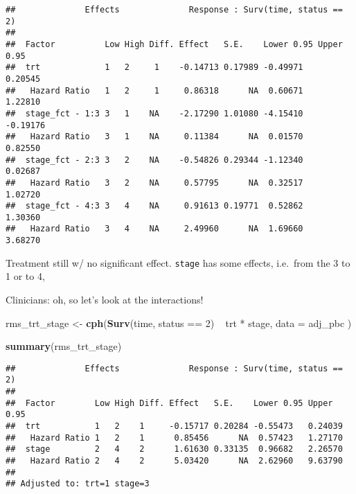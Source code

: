 \documentclass[]{book}
\newenvironment{Shaded}{\begin{snugshade}}{\end{snugshade}}
\newcommand{\KeywordTok}[1]{\textcolor[rgb]{0.13,0.29,0.53}{\textbf{{#1}}}}
\newcommand{\DataTypeTok}[1]{\textcolor[rgb]{0.13,0.29,0.53}{{#1}}}
\newcommand{\DecValTok}[1]{\textcolor[rgb]{0.00,0.00,0.81}{{#1}}}
\newcommand{\StringTok}[1]{\textcolor[rgb]{0.31,0.60,0.02}{{#1}}}
\newcommand{\OtherTok}[1]{\textcolor[rgb]{0.56,0.35,0.01}{{#1}}}
\newcommand{\NormalTok}[1]{{#1}}
\theoremstyle{definition}
\theoremstyle{definition}
\theoremstyle{definition}
\theoremstyle{remark}
\begin{document}
\begin{verbatim}
##              Effects              Response : Surv(time, status == 2) 
## 
##  Factor          Low High Diff. Effect   S.E.    Lower 0.95 Upper 0.95
##  trt             1   2     1    -0.14713 0.17989 -0.49971    0.20545  
##   Hazard Ratio   1   2     1     0.86318      NA  0.60671    1.22810  
##  stage_fct - 1:3 3   1    NA    -2.17290 1.01080 -4.15410   -0.19176  
##   Hazard Ratio   3   1    NA     0.11384      NA  0.01570    0.82550  
##  stage_fct - 2:3 3   2    NA    -0.54826 0.29344 -1.12340    0.02687  
##   Hazard Ratio   3   2    NA     0.57795      NA  0.32517    1.02720  
##  stage_fct - 4:3 3   4    NA     0.91613 0.19771  0.52862    1.30360  
##   Hazard Ratio   3   4    NA     2.49960      NA  1.69660    3.68270
\end{verbatim}

Treatment still w/ no significant effect. \texttt{stage} has some
effects, i.e.~from the 3 to 1 or to 4,

Clinicians: oh, so let's look at the interactions!

\begin{Shaded}
\begin{Highlighting}[]
\NormalTok{rms_trt_stage <-}\StringTok{ }\KeywordTok{cph}\NormalTok{(}\KeywordTok{Surv}\NormalTok{(time, status ==}\StringTok{ }\DecValTok{2}\NormalTok{) ~}\StringTok{ }\NormalTok{trt *}\StringTok{ }\NormalTok{stage,}
  \DataTypeTok{data =} \NormalTok{adj_pbc}
\NormalTok{)}

\KeywordTok{summary}\NormalTok{(rms_trt_stage)}
\end{Highlighting}
\end{Shaded}

\begin{verbatim}
##              Effects              Response : Surv(time, status == 2) 
## 
##  Factor        Low High Diff. Effect   S.E.    Lower 0.95 Upper 0.95
##  trt           1   2    1     -0.15717 0.20284 -0.55473   0.24039   
##   Hazard Ratio 1   2    1      0.85456      NA  0.57423   1.27170   
##  stage         2   4    2      1.61630 0.33135  0.96682   2.26570   
##   Hazard Ratio 2   4    2      5.03420      NA  2.62960   9.63790   
## 
## Adjusted to: trt=1 stage=3
\end{verbatim}

\begin{Shaded}
\end{Shaded}
\end{document}

